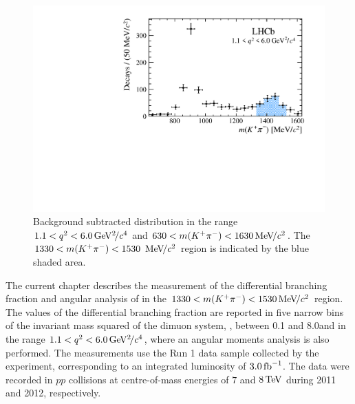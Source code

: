 \begin{figure}[!tb]
 \centering
 \includegraphics[width=0.6\linewidth]{figs/kpimm/introduction/full-mkpi.pdf}
 \caption{Background subtracted \mkpi distribution in the range $1.1<{q^2}<6.0{\mathrm{\,Ge\kern -0.1em V^2\!/}c^4}$ and $630<m({{K}^+}{{\pi}^-})<1630{\mathrm{\,Me\kern -0.1em V\!/}c^2}$. The $1330<m({{K}^+}{{\pi}^-})<1530~{\mathrm{\,Me\kern -0.1em V\!/}c^2}$ region is indicated by the blue shaded area.}
\label{fig:full-mkpi}
\end{figure}

The current chapter describes the measurement of the differential branching fraction and angular analysis of \BdToKpimm in the $1330<m({{K}^+}{{\pi}^-})<1530{\mathrm{\,Me\kern -0.1em V\!/}c^2}$ region. The values of the differential branching fraction are reported in five narrow bins of the invariant mass squared of the dimuon system, \qsq, between 0.1 and 8.0\gevgevcccc and in the range $1.1<{q^2}<6.0{\mathrm{\,Ge\kern -0.1em V^2\!/}c^4}$,  where an angular moments analysis is also performed. The measurements use the Run 1 data sample collected by the \lhcb experiment, corresponding to an integrated luminosity of $3.0\mbox{\,fb}^{-1}$. The data were recorded in $pp$ collisions at centre-of-mass energies of $7$ and $8\mathrm{\,Te\kern -0.1em V}$ during 2011 and 2012, respectively. 